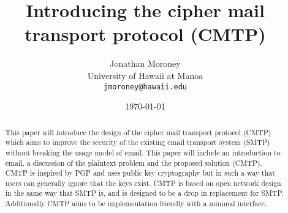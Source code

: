 \documentclass[a4paper,11pt]{article}
\begin{document}
\title{Introducing the cipher mail transport protocol (CMTP)}
\author{Jonathan Moroney\\
University of Hawaii at Manoa\\
\texttt{jmoroney@hawaii.edu}}
\date{\today}

\maketitle
\tableofcontents

\begin{abstract}
This paper will introduce the design of the cipher mail transport protocol (CMTP) which aims to improve the security of the existing email transport system (SMTP) without breaking the usage model of email. This paper will include an introduction to email, a discussion of the plaintext problem and the proposed solution (CMTP). CMTP is inspired by PGP and uses public key cryptography but in such a way that users can generally ignore that the keys exist. CMTP is based on open network design in the same way that SMTP is, and is designed to be a drop in replacement for SMTP. Additionally CMTP aims to be implementation friendly with a minimal interface.
\end{abstract}





\end{document}
